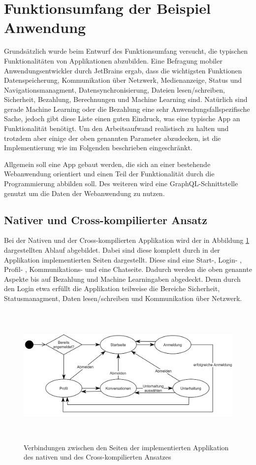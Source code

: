 \section{Funktionsumfang der Beispiel Anwendung}
Grundsätzlich wurde beim Entwurf des Funktionsumfang versucht, die typischen Funktionalitäten von Applikationen abzubilden. Eine Befragung mobiler Anwendungsentwickler durch JetBrains ergab, dass die wichtigsten Funktionen Datenspeicherung, Kommunikation über Netzwerk, Medienanzeige, Status und Navigationsmanagment, Datensynchronisierung, Dateien lesen/schreiben, Sicherheit, Bezahlung, Berechnungen und Machine Learning sind\cite{JetBrains_miscellaneous_2021}. Natürlich sind gerade Machine Learning oder die Bezahlung eine sehr Anwendungsfallspezifische Sache, jedoch gibt diese Liste einen guten Eindruck, was eine typische App an Funktionalität benötigt.
Um den Arbeitsaufwand realistisch zu halten und trotzdem aber einige der oben genannten Parameter abzudecken, ist die Implementierung wie im Folgenden beschrieben eingeschränkt.

Allgemein soll eine App gebaut werden, die sich an einer bestehende Webanwendung orientiert und einen Teil der Funktionalität durch die Programmierung abbilden soll. Des weiteren wird eine GraphQL-Schnittstelle genutzt um die Daten der Webanwendung zu nutzen. 

\subsection{Nativer und Cross-kompilierter Ansatz}
Bei der Nativen und der Cross-kompilierten Applikation wird der in Abbildung \ref{fig:pageflow} dargestellten Ablauf abgebildet. Dabei sind diese komplett durch in der Applikation implementierten Seiten dargestellt. Diese sind eine Start-, Login- , Profil- , Kommunikations- und eine Chatseite. Dadurch werden die oben genannte Aspekte bis auf Bezahlung und Machine Learningaben abgedeckt. Denn durch den Login etwa erfüllt die Applikation teilweise die Bereiche Sicherheit, Statusmanagment, Daten lesen/schreiben und Kommunikation über Netzwerk. 

\begin{figure}[ht]
  \centering
  \includegraphics[height=7cm,keepaspectratio]{images/Pageflow_native_flutter.png} 
  \caption[Seitenablauf der implemierten nativen und Cross-kompilierten Applikation]{Verbindungen zwischen den Seiten der implementierten Applikation des nativen und des Cross-kompilierten Ansatzes}
  \label{fig:pageflow}
\end{figure}

